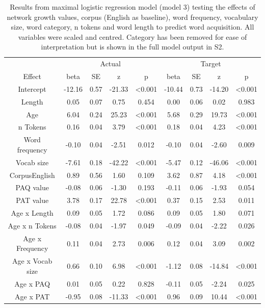 \documentclass[
  man]{apa6}
\begin{document}
\begin{longtable}[t]{ccccccccc}
\caption{\label{tab:table-data-summary}Results from maximal logistic regression model (model 3) testing the effects of network growth values, corpus (English as baseline), word frequency, vocabulary size, word category, n tokens and word length to predict word acquisition. All variables were scaled and centred. Category has been removed for ease of interpretation but is shown in the full model output in S2.}\\
\toprule
\multicolumn{1}{c}{ } & \multicolumn{4}{c}{Actual} & \multicolumn{4}{c}{Target} \\
\cmidrule(l{3pt}r{3pt}){2-5} \cmidrule(l{3pt}r{3pt}){6-9}
Effect & beta & SE & z & p & beta & SE & z & p\\
\midrule
Intercept & -12.16 & 0.57 & -21.33 & <0.001 & -10.44 & 0.73 & -14.20 & <0.001\\
Length & 0.05 & 0.07 & 0.75 & 0.454 & 0.00 & 0.06 & 0.02 & 0.983\\
Age & 6.04 & 0.24 & 25.23 & <0.001 & 5.68 & 0.29 & 19.73 & <0.001\\
n Tokens & 0.16 & 0.04 & 3.79 & <0.001 & 0.18 & 0.04 & 4.23 & <0.001\\
Word frequency & -0.10 & 0.04 & -2.51 & 0.012 & -0.10 & 0.04 & -2.60 & 0.009\\
\addlinespace
Vocab size & -7.61 & 0.18 & -42.22 & <0.001 & -5.47 & 0.12 & -46.06 & <0.001\\
CorpusEnglish & 0.89 & 0.56 & 1.60 & 0.109 & 3.62 & 0.87 & 4.18 & <0.001\\
PAQ value & -0.08 & 0.06 & -1.30 & 0.193 & -0.11 & 0.06 & -1.93 & 0.054\\
PAT value & 3.78 & 0.17 & 22.78 & <0.001 & 0.37 & 0.15 & 2.53 & 0.011\\
Age x Length & 0.09 & 0.05 & 1.72 & 0.086 & 0.09 & 0.05 & 1.80 & 0.071\\
\addlinespace
Age x n Tokens & -0.08 & 0.04 & -1.97 & 0.049 & -0.09 & 0.04 & -2.22 & 0.026\\
Age x Frequency & 0.11 & 0.04 & 2.73 & 0.006 & 0.12 & 0.04 & 3.09 & 0.002\\
Age x Vocab size & 0.66 & 0.10 & 6.98 & <0.001 & -1.12 & 0.08 & -14.84 & <0.001\\
Age x PAQ & 0.01 & 0.05 & 0.22 & 0.828 & -0.11 & 0.05 & -2.24 & 0.025\\
Age x PAT & -0.95 & 0.08 & -11.33 & <0.001 & 0.96 & 0.09 & 10.44 & <0.001\\
\bottomrule
\end{longtable}
\end{document}

